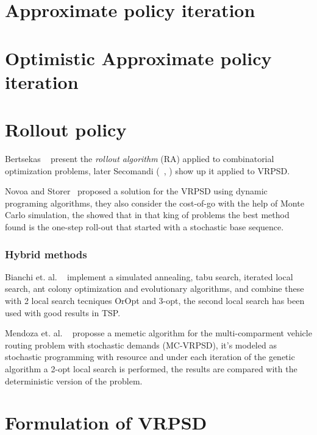 \cite{Bertsekas_1996}

\section{Approximate policy iteration}

\section{Optimistic Approximate policy iteration}

\section{Rollout policy}

\cite{Bertsekas1997}



Bertsekas ~\cite{Bertsekas1997} present the \textit{rollout algorithm} (RA) applied to combinatorial optimization problems, later Secomandi (~\cite{Secomandi_1998}, \cite{secomandi_rollout_2001}) show up it applied to VRPSD.

Novoa and Storer~\cite{novoa_approximate_2009} proposed a solution for the VRPSD using dynamic programing algorithms, they also consider the cost-of-go with the help of Monte Carlo simulation, the showed that in that king of problems the best method found is the one-step roll-out that started with a stochastic base sequence.

\subsubsection{Hybrid methods}

Bianchi et. al. ~\cite{bianchi_hybrid_2006} implement a simulated annealing, tabu search, iterated local search, ant colony optimization and evolutionary algorithms, and combine these with 2 local search tecniques OrOpt and 3-opt, the second local search has been used with good results in TSP.

Mendoza et. al. ~\cite{mendoza_memetic_2010} proposse a memetic algorithm for the multi-comparment vehicle routing problem with stochastic demands (MC-VRPSD), it's modeled as stochastic programming with resource and under each iteration of the genetic algorithm a 2-opt local search is performed, the results are compared with the deterministic version of the problem.

\section{Formulation of VRPSD}\label{sec:Form_VRPSD}

